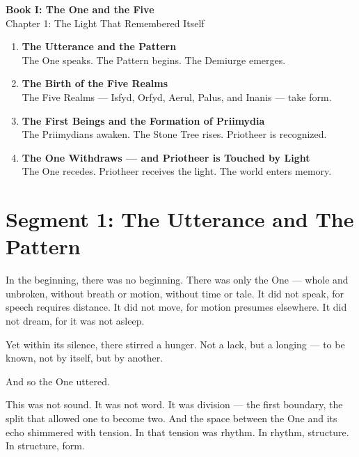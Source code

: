 \documentclass[11pt]{article}
\begin{document}
\begin{center}
    \Large\textbf{Book I: The One and the Five} \\
    \large Chapter 1: The Light That Remembered Itself \\
\end{center}

\vspace{1in}


\begin{center}
\begin{enumerate}
    \item \textbf{The Utterance and the Pattern} \\
    The One speaks. The Pattern begins. The Demiurge emerges.
    \vspace{1in}
    \item \textbf{The Birth of the Five Realms} \\
    The Five Realms — Isfyd, Orfyd, Aerul, Palus, and Inanis — take form.
    \vspace{1in}
    \item \textbf{The First Beings and the Formation of Priimydia} \\
    The Priimydians awaken. The Stone Tree rises. Priotheer is recognized.
    \vspace{1in}
    \item \textbf{The One Withdraws — and Priotheer is Touched by Light} \\
    The One recedes. Priotheer receives the light. The world enters memory.
\end{enumerate}
\end{center}

\newpage

\section*{Segment 1: The Utterance and The Pattern}

In the beginning, there was no beginning. There was only the One — whole and unbroken, without breath or motion, without time or tale.  
It did not speak, for speech requires distance.  
It did not move, for motion presumes elsewhere.  
It did not dream, for it was not asleep.

Yet within its silence, there stirred a hunger. Not a lack, but a longing — to be known, not by itself, but by another.

And so the One uttered.

This was not sound. It was not word. It was division — the first boundary, the split that allowed one to become two.  
And the space between the One and its echo shimmered with tension.  
In that tension was rhythm. In rhythm, structure. In structure, form.
\end{document}
